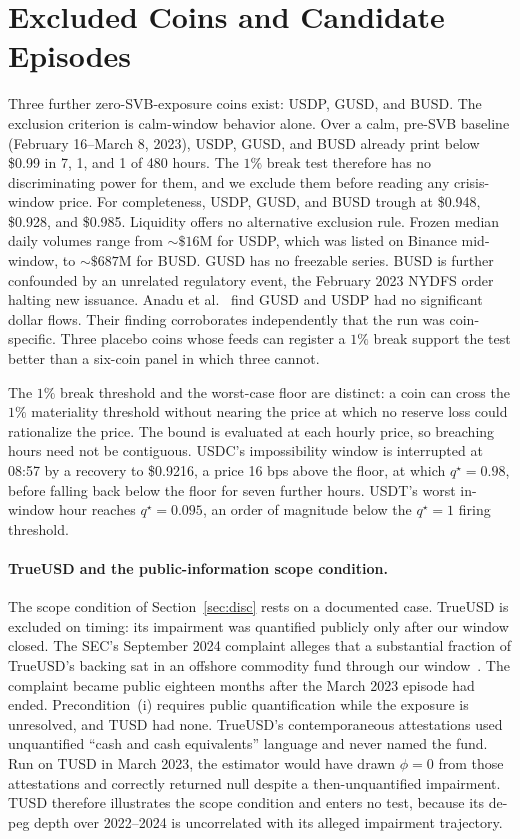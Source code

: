 \section{Excluded Coins and Candidate Episodes}
\label{app:excl}
Three further zero-SVB-exposure coins exist: USDP, GUSD, and BUSD. The exclusion
criterion is calm-window behavior alone. Over a calm, pre-SVB baseline (February
16--March 8, 2023), USDP, GUSD, and BUSD already print below \$0.99 in 7, 1, and 1 of 480
hours. The $1\%$ break test therefore has no discriminating power for them, and we exclude them
before reading any crisis-window price. For completeness, USDP, GUSD, and BUSD trough at \$0.948, \$0.928,
and \$0.985. Liquidity offers no alternative exclusion rule. Frozen
median daily volumes range from ${\sim}\$16$M for USDP, which was listed on Binance
mid-window, to ${\sim}\$687$M for BUSD. GUSD has no freezable series. BUSD is further
confounded by an unrelated regulatory event, the February 2023 NYDFS order halting new
issuance.
Anadu et al.~\cite{anadu2024} find GUSD and USDP had no significant dollar flows. Their
finding corroborates independently that the run was coin-specific. Three placebo coins whose
feeds can register a $1\%$ break support the test better than a six-coin panel in which
three cannot.

The $1\%$ break threshold and the worst-case floor are distinct: a coin can cross the
$1\%$ materiality threshold without nearing the price at which no reserve loss could
rationalize the price. The bound is evaluated at each hourly price, so breaching hours need not be contiguous. USDC's impossibility window is interrupted at 08{:}57 by
a recovery to \$0.9216, a price 16 bps above the floor, at which $q^{\star}=0.98$, before falling back
below the floor for seven further hours. USDT's worst in-window hour reaches $q^{\star}=0.095$, an
order of magnitude below the $q^{\star}=1$ firing threshold.

\paragraph{TrueUSD and the public-information scope condition.} The scope condition of
Section~\ref{sec:disc} rests on a documented case. TrueUSD is excluded on timing: its
impairment was quantified publicly only after our window closed. The SEC's September 2024
complaint alleges that a substantial fraction of TrueUSD's backing sat in an offshore
commodity fund through our window~\cite{sectruecoin2024}. The complaint became public
eighteen months after the March 2023 episode had ended. Precondition~(i) requires public
quantification while the exposure is unresolved, and TUSD had none. TrueUSD's
contemporaneous attestations used unquantified ``cash and cash equivalents'' language and
never named the fund. Run on TUSD in March 2023, the estimator would have drawn $\phi=0$
from those attestations and correctly returned null despite a then-unquantified impairment. TUSD
therefore illustrates the scope condition and enters no test, because its de-peg depth
over 2022--2024 is uncorrelated with its alleged impairment trajectory.

